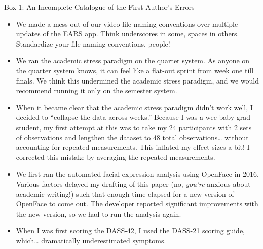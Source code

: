 \documentclass[authordate, empirical]{jote-new-article}
\begin{document}
\begin{table}[b!]
  \begin{adjustwidth}{-4cm}{}
    \vspace*{.5\baselineskip}

    \begin{joteBox}{
        Box 1: An Incomplete Catalogue of the First Author's Errors%
      }

      \renewcommand{\baselinestretch}{1.5}
      \small
      \begin{itemize}



        \item    We made a mess out of our video file naming conventions over multiple updates of the EARS app. Think underscores in some, spaces in others. Standardize your file naming conventions, people!



        \item    We ran the academic stress paradigm on the quarter system. As anyone on the quarter system knows, it can feel like a flat-out sprint from week one till finals. We think this undermined the academic stress paradigm, and we would recommend running it only on the semester system.



        \item    When it became clear that the academic stress paradigm didn't work well, I decided to “collapse the data across weeks.” Because I was a wee baby grad student, my first attempt at this was to take my 24 participants with 2 sets of observations and lengthen the dataset to 48 total observations… without accounting for repeated measurements. This inflated my effect sizes a bit! I corrected this mistake by averaging the repeated measurements.



        \item    We first ran the automated facial expression analysis using OpenFace in 2016. Various factors delayed my drafting of this paper (no, \emph{you're} anxious about academic writing!) such that enough time elapsed for a new version of OpenFace to come out. The developer reported significant improvements with the new version, so we had to run the analysis again.



        \item    When I was first scoring the DASS-42, I used the DASS-21 scoring guide, which… dramatically underestimated symptoms.




      \end{itemize}


    \end{joteBox}

  \end{adjustwidth}

\end{table}
\end{document}
